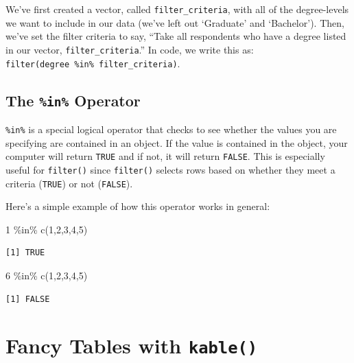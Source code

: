 \documentclass[
  letterpaper,
]{book}
\newenvironment{Shaded}{\begin{snugshade}}{\end{snugshade}}
\newcommand{\DecValTok}[1]{\textcolor[rgb]{0.68,0.00,0.00}{#1}}
\newcommand{\FunctionTok}[1]{\textcolor[rgb]{0.28,0.35,0.67}{#1}}
\newcommand{\NormalTok}[1]{\textcolor[rgb]{0.00,0.23,0.31}{#1}}
\newcommand{\SpecialCharTok}[1]{\textcolor[rgb]{0.37,0.37,0.37}{#1}}
\begin{document}
We've first created a vector, called \texttt{filter\_criteria}, with all
of the degree-levels we want to include in our data (we've left out
`Graduate' and `Bachelor'). Then, we've set the filter criteria to say,
``Take all respondents who have a degree listed in our vector,
\texttt{filter\_criteria}.'' In code, we write this as:
\texttt{filter(degree\ \%in\%\ filter\_criteria)}.

\hypertarget{the-in-operator}{%
\subsection{\texorpdfstring{The \texttt{\%in\%}
Operator}{The \%in\% Operator}}\label{the-in-operator}}

\texttt{\%in\%} is a special logical operator that checks to see whether
the values you are specifying are contained in an object. If the value
is contained in the object, your computer will return \texttt{TRUE} and
if not, it will return \texttt{FALSE}. This is especially useful for
\texttt{filter()} since \texttt{filter()} selects rows based on whether
they meet a criteria (\texttt{TRUE}) or not (\texttt{FALSE}).

Here's a simple example of how this operator works in general:

\begin{Shaded}
\begin{Highlighting}[]
\DecValTok{1} \SpecialCharTok{\%in\%} \FunctionTok{c}\NormalTok{(}\DecValTok{1}\NormalTok{,}\DecValTok{2}\NormalTok{,}\DecValTok{3}\NormalTok{,}\DecValTok{4}\NormalTok{,}\DecValTok{5}\NormalTok{)}
\end{Highlighting}
\end{Shaded}

\begin{verbatim}
[1] TRUE
\end{verbatim}

\begin{Shaded}
\begin{Highlighting}[]
\DecValTok{6} \SpecialCharTok{\%in\%} \FunctionTok{c}\NormalTok{(}\DecValTok{1}\NormalTok{,}\DecValTok{2}\NormalTok{,}\DecValTok{3}\NormalTok{,}\DecValTok{4}\NormalTok{,}\DecValTok{5}\NormalTok{)}
\end{Highlighting}
\end{Shaded}

\begin{verbatim}
[1] FALSE
\end{verbatim}

\hypertarget{fancy-tables-with-kable}{%
\section{\texorpdfstring{Fancy Tables with
\texttt{kable()}}{Fancy Tables with kable()}}\label{fancy-tables-with-kable}}
\end{document}
